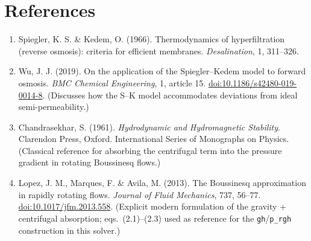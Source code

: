 \documentclass[11pt,a4paper]{article}
\begin{document}
\section{References}

\begin{enumerate}
	\item Spiegler, K. S. \& Kedem, O. (1966). Thermodynamics of hyperfiltration (reverse osmosis): criteria for efficient membranes. \emph{Desalination}, 1, 311–326.
	\item Wu, J. J. (2019). On the application of the Spiegler–Kedem model to forward osmosis. \emph{BMC Chemical Engineering}, 1, article 15. \href{https://doi.org/10.1186/s42480-019-0014-8}{doi:10.1186/s42480-019-0014-8}. (Discusses how the S–K model accommodates deviations from ideal semi-permeability.)
	\item Chandrasekhar, S. (1961). \emph{Hydrodynamic and Hydromagnetic Stability}. Clarendon Press, Oxford. International Series of Monographs on Physics. (Classical reference for absorbing the centrifugal term into the pressure gradient in rotating Boussinesq flows.)
	\item Lopez, J. M., Marques, F. \& Avila, M. (2013). The Boussinesq approximation in rapidly rotating flows. \emph{Journal of Fluid Mechanics}, 737, 56–77. \href{https://doi.org/10.1017/jfm.2013.558}{doi:10.1017/jfm.2013.558}. (Explicit modern formulation of the gravity + centrifugal absorption; eqs.~(2.1)–(2.3) used as reference for the \texttt{gh}/\texttt{p\_rgh} construction in this solver.)
\end{enumerate}
\end{document}
